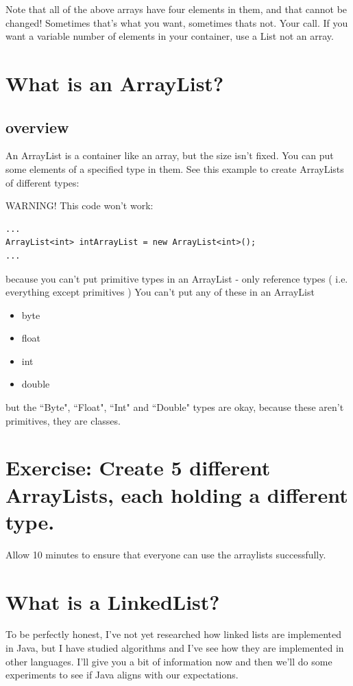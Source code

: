 \documentclass[12pt]{article}
\begin{document}


Note that all of the above arrays have four elements in them, and that cannot be changed! Sometimes that's what you want, sometimes thats not. Your call. If you want a variable number of elements in your container, use a List not an array.

\section{What is an ArrayList?}
\subsection{overview}
An ArrayList is a container like an array, but the size isn't fixed. You can put some elements of a specified type in them. See this example to create ArrayLists of different types:



WARNING! This code won't work:
\begin{lstlisting}
...
ArrayList<int> intArrayList = new ArrayList<int>();
...
\end{lstlisting}

because you can't put primitive types in an ArrayList - only reference types ( i.e. everything except primitives )
You can't put any of these in an ArrayList

\begin{itemize}
\item byte
\item float
\item int
\item double
\end{itemize}

but the ``Byte", ``Float", ``Int" and ``Double" types are okay, because these aren't primitives, they are classes.


\section{Exercise: Create 5 different ArrayLists, each holding a different type.}

Allow 10 minutes to ensure that everyone can use the arraylists successfully.


\section{What is a LinkedList?}
To be perfectly honest, I've not yet researched how linked lists are implemented in Java, but I have studied algorithms and I've see how they are implemented in other languages. I'll give you a bit of information now and then we'll do some experiments to see if Java aligns with our expectations.
\end{document}
